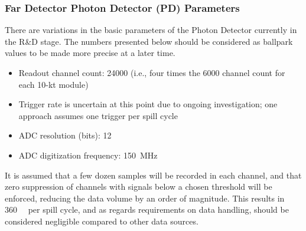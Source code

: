 



\subsubsection{Far Detector Photon Detector (PD) Parameters}
There are variations in the basic parameters of the Photon Detector
currently in the R\&D stage. The numbers presented below should be
considered as ballpark values to be made more precise at a later time.
\begin{itemize}
\item Readout channel count: \num{24000} (i.e., four times the \num{6000} channel count for each 10-kt module)
\item Trigger rate is uncertain at this point due to ongoing
  investigation; one approach assumes one trigger per spill cycle
\item ADC resolution (bits): 12
\item ADC digitization frequency: \SI{150}{\MHz}
\end{itemize}
It is assumed that a few dozen samples will be recorded in each
channel, and that zero suppression of channels with signals
below a chosen threshold will be enforced, reducing the data volume by 
an order of magnitude.  This results in \SI{360}{\kilo\byte} per spill
cycle, and as regards requirements on data handling, should be considered negligible compared to other data sources.


